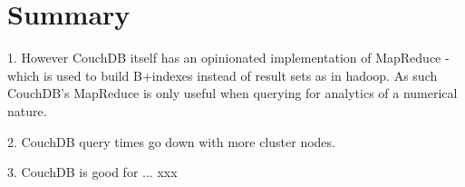 \section{Summary}
1. However CouchDB itself has an opinionated implementation of MapReduce - which is used to build B+indexes instead of result sets as in hadoop. As such CouchDB's MapReduce is only useful when querying for analytics of a numerical nature.

2. CouchDB query times go down with more cluster nodes.

3. CouchDB is good for ... xxx

